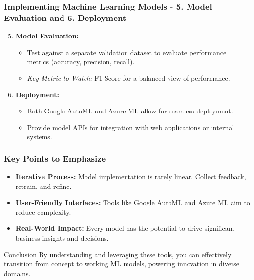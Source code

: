 \documentclass[aspectratio=169]{beamer}
\begin{document}
\begin{frame}[fragile]
    \frametitle{Implementing Machine Learning Models - 5. Model Evaluation and 6. Deployment}
    \begin{enumerate}
        \setcounter{enumi}{4}
        \item \textbf{Model Evaluation:}
        \begin{itemize}
            \item Test against a separate validation dataset to evaluate performance metrics (accuracy, precision, recall).
            \item \textit{Key Metric to Watch:} F1 Score for a balanced view of performance.
        \end{itemize}

        \item \textbf{Deployment:}
        \begin{itemize}
            \item Both Google AutoML and Azure ML allow for seamless deployment.
            \item Provide model APIs for integration with web applications or internal systems.
        \end{itemize}
    \end{enumerate}
\end{frame}

\begin{frame}[fragile]
    \frametitle{Key Points to Emphasize}
    \begin{itemize}
        \item \textbf{Iterative Process:} Model implementation is rarely linear. Collect feedback, retrain, and refine.
        \item \textbf{User-Friendly Interfaces:} Tools like Google AutoML and Azure ML aim to reduce complexity.
        \item \textbf{Real-World Impact:} Every model has the potential to drive significant business insights and decisions.
    \end{itemize}
    
    \begin{block}{Conclusion}
        By understanding and leveraging these tools, you can effectively transition from concept to working ML models, powering innovation in diverse domains.
    \end{block}
\end{frame}
\end{document}
